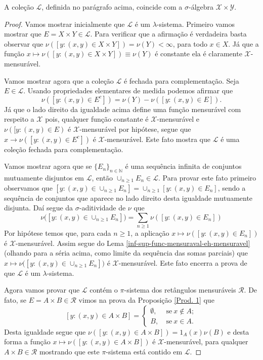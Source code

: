 \begin{proposicao}\label{Mens. Prod}
A coleção $\mathscr{L}$, definida no parágrafo acima, 
coincide com a $\sigma$-álgebra  $\mathscr{X}\times \mathscr{Y}$.
\end{proposicao}
\begin{proof}
Vamos mostrar inicialmente que $\mathscr{L}$ 
é um $\lambda$-sistema. 
Primeiro vamos mostrar que $E=X\times Y\in \mathscr{L}$.
Para verificar que a afirmação é verdadeira 
basta observar que $\nu([y:(x,y)\in X\times Y])=\nu(Y) < \infty$, 
para todo $x\in X$. Já que a função 
$x\mapsto \nu([y:(x,y)\in X\times Y])\equiv \nu(Y)$ 
é constante ela é claramente $\mathscr{X}$-mensurável.

Vamos mostrar agora que a coleção $\mathscr{L}$ é fechada 
para complementação. Seja $E\in \mathscr{L}$.
Usando propriedades elementares de medida 
podemos afirmar que 
\[ 
\nu( [y:(x,y)\in E^c] )=\nu(Y)-\nu([y:(x,y)\in E]).
\]
Já que o lado direito da igualdade acima 
define uma função mensurável com 
respeito a $\mathscr{X}$ pois,  
qualquer função constante é $\mathscr{X}$-mensurável
e $\nu([y:(x,y)\in E)$ é $\mathscr{X}$-mensurável por hipótese,
segue que $x\to \nu( [y:(x,y)\in E^c] )$ é $\mathscr{X}$-mensurável. 
Este fato mostra que $\mathscr{L}$ é uma coleção fechada para complementação.

Vamos mostrar agora que se $\{ E_n \}_{n\in\mathbb{N}}$ 
é uma sequência infinita de conjuntos mutuamente disjuntos em $\mathscr{L}$,
então $\cup_{n\geq 1} E_n\in \mathscr{L}$. 
Para provar este fato primeiro observamos que 
$
[y:(x,y)\in \cup_{n\geq 1}E_n ] 
= 
\cup_{n \geq 1}  
[y:(x,y)\in E_n ]
$, sendo a sequência de conjuntos que aparece no lado direito
desta igualdade mutuamente disjunta.  
Daí segue da $\sigma$-aditividade de $\nu$ que
\[
\nu \big( [y:(x,y)\in \cup_{n\geq 1}E_n ] \big)
= 
\sum_{n \geq 1}  
\nu ([y:(x,y)\in E_n ])
\]
Por hipótese temos que, para cada $n\geq 1$, 
a aplicação $x\mapsto \nu ([y:(x,y)\in E_n ])$ 
é $\mathscr{X}$-mensurável. 
Assim segue do Lema \ref{inf-sup-func-mensuraval-eh-mensuravel} 
(olhando para a séria acima, como limite da sequência das somas parciais) 
que $x\mapsto \nu \big( [y:(x,y)\in \cup_{n\geq 1}E_n ] \big)$ é 
$\mathscr{X}$-mensurável. 
Este fato encerra a prova de que $\mathscr{L}$ é um $\lambda$-sistema.
 
Agora vamos provar que $\mathscr{L}$ contém o $\pi$-sistema 
dos retângulos mensuráveis $\mathscr{R}$. 
De fato, se $E=A\times B\in \mathscr{R}$ 
vimos na prova da Proposição \ref{Prod. 1} que 
\[
[y:(x,y)\in A\times B ]
=
\begin{cases}
\emptyset,&\ \text{se}\ x\notin A;
\\
B,&\ \text{se}\ x\in A. 
\end{cases}
\] 
Desta igualdade segue que
$\nu([y:(x,y)\in A\times B ]) = 1_A(x)\nu(B)$ 
e desta forma a função $x\mapsto \nu([y:(x,y)\in A\times B ])$ 
é $\mathscr{X}$-mensurável, para qualquer $A\times B\in\mathscr{R}$
mostrando que este $\pi$-sistema está contido em $\mathscr{L}$. 


\end{proof}
